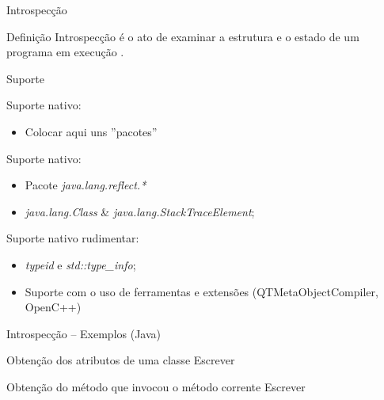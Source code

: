 \documentclass[12pt,t]{beamer}
\begin{document}
 	 \begin{frame}{Introspecção}
 	 	\begin{block}{Definição}
 	 		Introspecção é o ato de examinar a estrutura e o estado de um programa em execução \cite{forman2004java}.\\
 	 	\end{block}
 	 	\begin{block}{Suporte}
 	 		\begin{description}[Smalltalk:]
 	 			\item [Smalltalk:] Suporte nativo:
	 	 			\begin{itemize}
	 	 				\item\alert{Colocar aqui uns ''pacotes''}
	 	 			\end{itemize}

 	 			\item [Java:] Suporte nativo: 
 	 			\begin{itemize}
	 	 			\item Pacote \emph{java.lang.reflect.*} \\ 
	 	 			\item \emph{java.lang.Class} \& \emph{java.lang.StackTraceElement}; 	 				
 	 			\end{itemize}

 	 			\item [C++:] Suporte nativo rudimentar: 
	 	 			\begin{itemize}
	 	 				\item \emph{typeid} e \emph{std::type\_info};
	 	 				\item Suporte com o uso de ferramentas e extensões (QTMetaObjectCompiler, OpenC++)
	 	 			\end{itemize}
 			\end{description}
 		\end{block}
 	 \end{frame}
 	 \begin{frame}{Introspecção -- Exemplos (Java)}
 	 	\begin{exampleblock}{Obtenção dos atributos de uma classe}
 	 		\alert{Escrever}
 	 	\end{exampleblock}
 	 	\begin{exampleblock}{Obtenção do método que invocou o método corrente}
 	 		\alert{Escrever}
 	 	\end{exampleblock}
 	 \end{frame}
\end{document}
